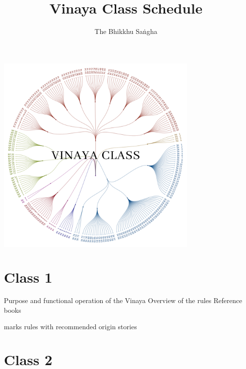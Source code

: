 \documentclass[11pt,oneside]{memoir}
\title{Vinaya Class Schedule}
\author{The Bhikkhu Saṅgha}
\begin{document}
\thispagestyle{empty}

\vspace*{-10mm}
{\centering
  \includegraphics[width=100mm]{../../assets/vinaya-class-title-observable/vinaya-class-title.w1800.png}
\par}

\bigskip

\chapter{Class 1}

\centeringsectiontrue

{\centering
{}

 Purpose and functional operation of the Vinaya\quad
{} Overview of the rules\quad
{} Reference books

\orig{} marks rules with recommended origin stories
\par}

\centeringsectionfalse
\numberedtopicstrue

\chapter{Class 2}
\end{document}
